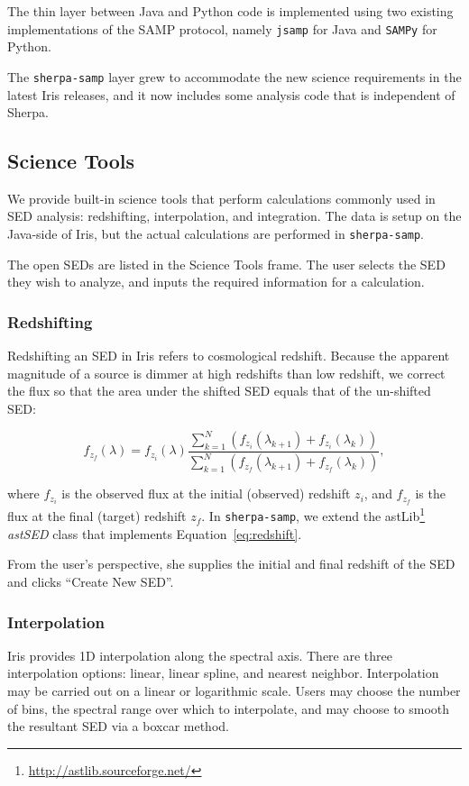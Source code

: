 \documentclass[final,5p,authoryear]{elsarticle}
\begin{document}
The thin layer between Java and Python code is implemented using two existing
implementations of the SAMP protocol, namely \verb|jsamp| for Java and
\verb|SAMPy| for Python.

The \verb|sherpa-samp| layer grew to accommodate the new science requirements in
the latest Iris releases, and it now includes some analysis code that is
independent of Sherpa.

\subsection{Science Tools} We provide built-in science tools that perform
calculations commonly used in SED analysis: redshifting, interpolation, and
integration. The data is setup on the Java-side of Iris, but the actual
calculations are performed in \verb|sherpa-samp|.

The open SEDs are listed in the Science Tools frame. The user selects the SED
they wish to analyze, and inputs the required information for a calculation.

\subsubsection{Redshifting} Redshifting an SED in Iris refers to cosmological
redshift. Because the apparent magnitude of a source is dimmer at high redshifts
than low redshift, we correct the flux so that the area under the shifted SED
equals that of the un-shifted SED:

\begin{equation} \label{eq:redshift} f_{z_{f}}(\lambda) = f_{z_{i}}(\lambda)
\frac{\sum_{k=1}^N
(f_{z_{i}}(\lambda_{k+1})+f_{z_{i}}(\lambda_{k}))}{\sum_{k=1}^N
(f_{z_{f}}(\lambda_{k+1})+f_{z_{f}}(\lambda_{k}))}, \end{equation}

where $f_{z_i}$ is the observed flux at the initial (observed) redshift $z_i$,
and $f_{z_f}$ is the flux at the final (target) redshift $z_f$. In
\verb|sherpa-samp|, we extend the
astLib\footnote{\url{http://astlib.sourceforge.net/}} \textit{astSED} class that
implements Equation~\ref{eq:redshift}.

From the user's perspective, she supplies the initial and final redshift of the
SED and clicks ``Create New SED''.

\subsubsection{Interpolation} Iris provides 1D interpolation along the spectral
axis. There are three interpolation options: linear, linear spline, and nearest
neighbor. Interpolation may be carried out on a linear or logarithmic scale.
Users may choose the number of bins, the spectral range over which to
interpolate, and may choose to smooth the resultant SED via a boxcar method.
\end{document}
